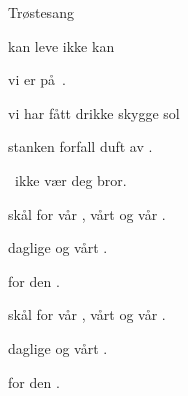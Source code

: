 \begin{SBSong}{Tr\o stesang}
\begin{SBVerse}
     kan  leve  ikke kan 

     vi er  p\aa\ .

     vi har f\aa tt drikke  skygge  sol

     stanken  forfall  duft av .

    \ ikke v\ae r  deg  bror.
  \end{SBVerse}
  \begin{SBChorus}
     sk\aa l for v\aa r , v\aa rt  og v\aa r .

     daglige  og v\aa rt  .

     for den  .
  \end{SBChorus}
  \begin{SBChorus}
     sk\aa l for v\aa r , v\aa rt  og v\aa r .

     daglige  og v\aa rt  .

     for den  .
  \end{SBChorus}
\end{SBSong}
